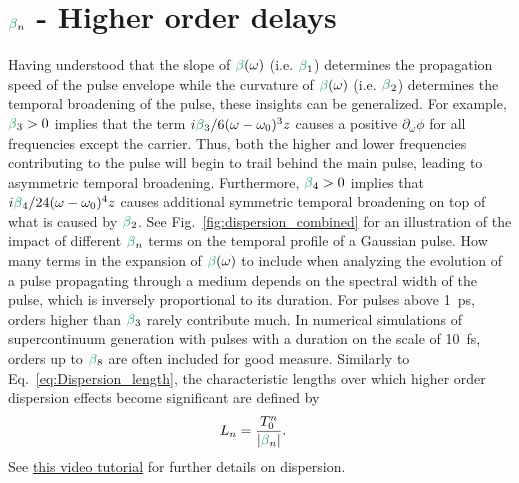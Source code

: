 \section{$\betag_n$ - Higher order delays}
Having understood that the slope of $\betag(\omega)$ (i.e. $\betag_1$) determines the propagation speed of the pulse envelope while the curvature of $\betag(\omega)$ (i.e. $\betag_2$) determines the temporal broadening of the pulse, these insights can be generalized. For example, $\betag_3>0$ implies that the term $i\betag_3/6(\omega-\omega_0)^3z$ causes a positive $\partial_\omega\phi$ for all frequencies except the carrier. Thus, both the higher and lower frequencies contributing to the pulse will begin to trail behind the main pulse, leading to asymmetric temporal broadening. Furthermore, $\betag_4>0$ implies that $i\betag_4/24(\omega-\omega_0)^4z$ causes additional symmetric temporal broadening on top of what is caused by $\betag_2$. See Fig.~\ref{fig:dispersion_combined} for an illustration of the impact of different $\betag_n$ terms on the temporal profile of a Gaussian pulse. How many terms in the expansion of $\betag(\omega)$ to include when analyzing the evolution of a pulse propagating through a medium depends on the spectral width of the pulse, which is inversely proportional to its duration. For pulses above 1~ps, orders higher than $\betag_3$ rarely contribute much. In numerical simulations of supercontinuum generation with pulses with a duration on the scale of 10~fs, orders up to $\betag_8$ are often included for good measure. Similarly to Eq.~\ref{eq:Dispersion_length}, the characteristic lengths over which higher order dispersion effects become significant are defined by
\begin{align}
\label{eq:dispersion_length_general}
    L_{n} &= \frac{T_0^n}{|\betag_n|}.
\end{align}
See \href{https://www.youtube.com/watch?v=E3S0BQiy3p8&ab_channel=YourFavouriteTA}{this video tutorial} for further details on dispersion.

